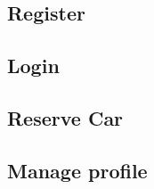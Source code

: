 \subsection{Register}


\subsection{Login}


\subsection{Reserve Car}


\subsection{Manage profile}
